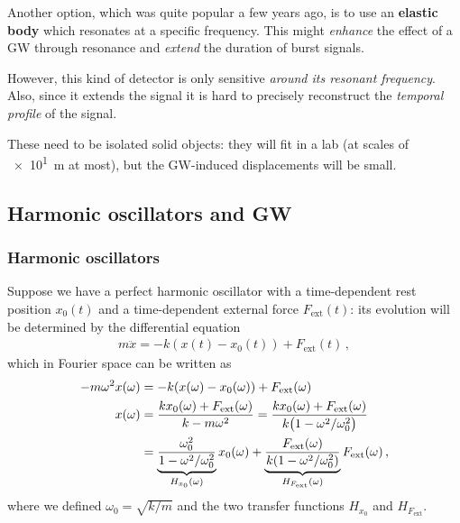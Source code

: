 \documentclass[main.tex]{subfiles}
\begin{document}
Another option, which was quite popular a few years ago, is to use an \textbf{elastic body} which resonates at a specific frequency. 
This might \emph{enhance} the effect of a GW through resonance and \emph{extend} the duration of burst signals. 

However, this kind of detector is only sensitive \emph{around its resonant frequency}. 
Also, since it extends the signal it is hard to precisely reconstruct the \emph{temporal profile} of the signal. 

These need to be isolated solid objects: they will fit in a lab (at scales of \SI{e1}{m} at most), but the GW-induced displacements will be small. 


\subsection{Harmonic oscillators and GW}

\subsubsection{Harmonic oscillators}

Suppose we have a perfect harmonic oscillator with a time-dependent rest position \(x_0(t) \) and a time-dependent external force \(F _{\text{ext}} (t)\): its evolution will be determined by the differential equation 
%
\begin{align}
m \ddot{x} = -k (x(t) - x_0 (t) ) + F _{\text{ext}} (t)
\,,
\end{align}
%
which in Fourier space can be written as 
%
\begin{align}
- m \omega^2 x(\omega ) &= - k (x(\omega ) - x_0 (\omega )) + F _{\text{ext}} (\omega )  \\
x(\omega ) &= \frac{k x_0 (\omega ) + F _{\text{ext}}(\omega )}{k - m \omega^2} = \frac{k x_0 (\omega ) + F _{\text{ext}}(\omega )}{k \qty(1 - \omega^2 / \omega_0^2)}  \\
&= \underbrace{\frac{\omega_0^2}{1 - \omega^2 /\omega_0^2}}_{H_{x_0 }(\omega )}
x_0 (\omega ) + 
\underbrace{\frac{F _{\text{ext}} (\omega )}{k (1 - \omega^2 / \omega_0^2)} }_{H_{F _{\text{ext}}} (\omega )}
F _{\text{ext}}(\omega )
\,,
\end{align}
%
where we defined \(\omega_0 = \sqrt{k / m}\) and the two transfer functions \(H_{x_0 }\) and \(H_{F _{\text{ext}}}\).
\end{document}
